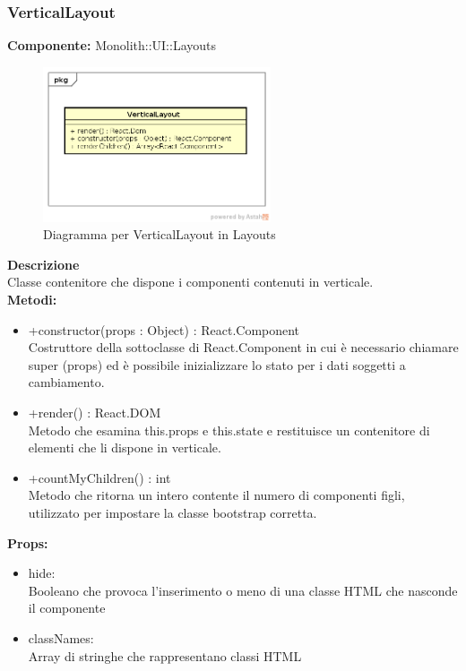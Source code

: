 \clearpage

\subsubsection{VerticalLayout}
\textbf{Componente:}  Monolith::UI::Layouts\\
   \FloatBarrier
   \begin{figure}[ht]
   \centering
   \includegraphics[width=0.6\textwidth]{img/single-VerticalLayout.png}
   \caption{{Diagramma per VerticalLayout in Layouts}}
\end{figure}
\FloatBarrier
\textbf{Descrizione}\\
Classe contenitore che dispone i componenti contenuti in verticale. \\
\textbf{Metodi:}
\begin{itemize}

\item +constructor(props : Object) : React.Component 
\\
Costruttore della sottoclasse di React.Component in cui è necessario chiamare super (props) ed è possibile inizializzare lo stato per i dati soggetti a cambiamento.

\item +render() : React.DOM 
\\
Metodo che esamina this.props e this.state e restituisce un contenitore di elementi che li dispone in verticale.

\item +countMyChildren() : int
\\
Metodo che ritorna un intero contente il numero di componenti figli, utilizzato per impostare la classe bootstrap corretta.

\end{itemize}

\textbf{Props:} 
\begin{itemize}
\item hide: 
\\
Booleano che provoca l'inserimento o meno di una classe HTML che nasconde il componente
\item classNames: 
\\
Array di stringhe che rappresentano classi HTML

\end{itemize} 


